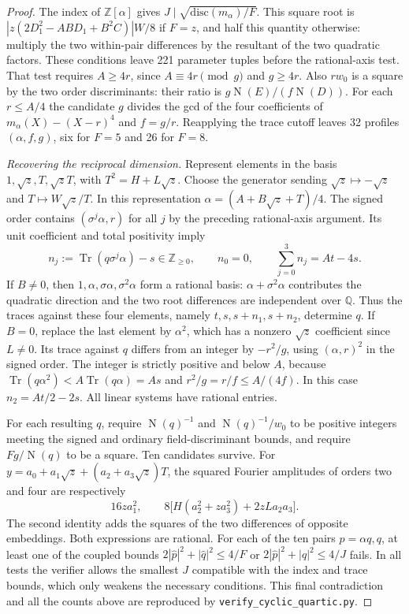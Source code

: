 \documentclass[11pt,a4paper]{article}
\numberwithin{equation}{section}
\begin{document}
\begin{proof}
The index of $\mathbb Z[\alpha]$ gives
$J\mid\sqrt{\mathrm{disc}(m_\alpha)/F}$. This square root is
$|z(2D_1^2-AB D_1+B^2C)|W/8$ if $F=z$, and half this quantity otherwise:
multiply the two within-pair differences by the resultant of the two
quadratic factors. These conditions leave 221 parameter tuples before
the rational-axis test. That test requires $A\ge4r$, since
$A\equiv4r\pmod g$ and $g\ge4r$. Also $r w_0$ is a square by the two
order discriminants: their ratio is $g\operatorname{N}(E)/
(f\operatorname{N}(D))$. For each $r\le A/4$ the candidate $g$ divides
the gcd of the four coefficients of $m_\alpha(X)-(X-r)^4$ and $f=g/r$.
Reapplying the trace cutoff leaves 32 profiles $(\alpha,f,g)$,
six for $F=5$ and 26 for $F=8$.

\medskip\noindent\emph{Recovering the reciprocal dimension.}
Represent elements in the basis $1,\sqrt z,T,\sqrt zT$, with
$T^2=H+L\sqrt z$. Choose the generator sending
$\sqrt z\mapsto-\sqrt z$ and $T\mapsto W\sqrt z/T$.
In this representation $\alpha=(A+B\sqrt z+T)/4$.
The signed order contains $(\sigma^j\alpha,r)$ for all $j$ by the
preceding rational-axis argument. Its unit coefficient and total
positivity imply
\[
 n_j:=\operatorname{Tr}(q\sigma^j\alpha)-s
       \in\mathbb Z_{\ge0},\qquad
 n_0=0,\qquad \sum_{j=0}^3 n_j=At-4s .
\]
If $B\ne0$, then
$1,\alpha,\sigma\alpha,\sigma^2\alpha$ form a rational basis:
$\alpha+\sigma^2\alpha$ contributes the quadratic direction and the
two root differences are independent over $\mathbb Q$. Thus the traces
against these four elements, namely $t,s,s+n_1,s+n_2$, determine $q$.
If $B=0$, replace the last element by $\alpha^2$, which has a nonzero
$\sqrt z$ coefficient since $L\ne0$. Its trace against $q$ differs from
an integer by $-r^2/g$, using $(\alpha,r)^2$ in the signed order.
The integer is strictly positive and below $A$, because
$\operatorname{Tr}(q\alpha^2)<A\operatorname{Tr}(q\alpha)=As$
and $r^2/g=r/f\le A/(4f)$.
In this case $n_2=At/2-2s$. All linear systems have rational entries.

For each resulting $q$, require $\operatorname{N}(q)^{-1}$ and
$\operatorname{N}(q)^{-1}/w_0$ to be positive integers meeting the
signed and ordinary field-discriminant bounds, and require
$Fg/\operatorname{N}(q)$ to be a square. Ten candidates survive.
For $y=a_0+a_1\sqrt z+(a_2+a_3\sqrt z)T$, the squared Fourier amplitudes
of orders two and four are respectively
\[
 16z a_1^2,\qquad
 8\big[H(a_2^2+za_3^2)+2zLa_2a_3\big].
\]
The second identity adds the squares of the two differences of opposite
embeddings. Both expressions are rational. For each of the ten pairs
$p=\alpha q,q$, at least one of the coupled bounds
$2|\widehat p|^2+|\widehat q|^2\le4/F$ or
$2|\widehat p|^2+|\widehat q|^2\le4/J$ fails. In all tests the verifier
allows the smallest $J$ compatible with the index and trace bounds, which
only weakens the necessary conditions. This final contradiction and all
the counts above are reproduced by \texttt{verify\_cyclic\_quartic.py}.
\end{proof}
\end{document}
